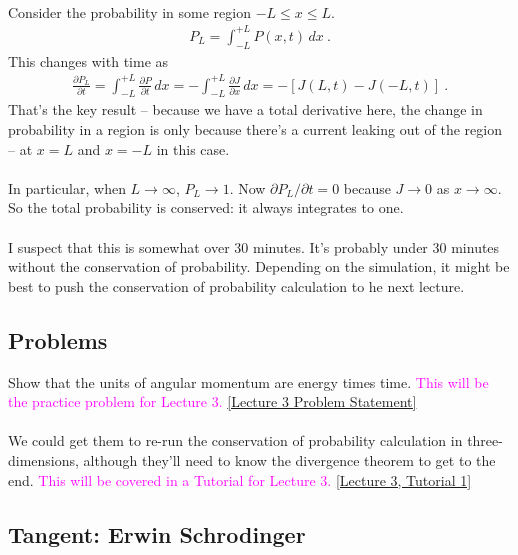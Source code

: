 \documentclass[12pt]{article}
\def\be{\begin{eqnarray}}
\def\ee{\end{eqnarray}}
\newcommand{\nn}{\nonumber}
\newcommand\para{\paragraph{}}
\newcommand{\ppp}[2]{\frac{\partial {#1}}{\partial {#2}}}
\newcommand{\ra}{\rightarrow}
\newcommand{\alyssa}{\textcolor{magenta}}
\begin{document}
\para
{\color{olive} Consider the probability in some region $-L \leq x\leq L$. 
%
\be P_L = \int_{-L}^{+L} P(x,t) \,dx\ .\nn\ee
%
This changes with time as
%
\be \ppp{P_L}{t} = \int_{-L}^{+L} \ppp{P}{t} \,dx = -\int_{-L}^{+L} \ppp{J}{x} \,dx = -\left[J(L,t) - J(-L,t)\right]\ .\nn\ee 
}
That's the key result -- because we have a total derivative here, the change in probability in a region is only because there's a current leaking out of the region -- at $x=L$ and $x=-L$ in this case. 

\para
{\color{olive} In particular, when $L\rightarrow \infty$, $P_L\ra 1$. Now $\partial P_L/\partial t=0$ because $J\ra 0$ as $x\ra \infty$. So the total probability is conserved: it always integrates to one.}

\para
{\color{red} I suspect that this is somewhat over 30 minutes. It's probably under 30 minutes without the conservation of probability. Depending on the simulation, it might be best to push the conservation of probability calculation to he next lecture.}

{\color{blue} 
\subsection{Problems}
Show that the units of angular momentum are energy times time. \alyssa{This will be the practice problem for Lecture 3.} \href{https://drive.google.com/file/d/1Qu2bBqQa2FQBaBoZ9YU335qluru4K50T/view?usp=drive_link}{[Lecture 3 Problem Statement]}

\para
We could get them to re-run the conservation of probability calculation in three-dimensions, although they'll need to know the divergence theorem to get to the end. \alyssa{This will be covered in a Tutorial for Lecture 3.} \href{https://drive.google.com/file/d/12JSixdQ0R_mRoL3O6Sr0HWOza6faMNb5/view?usp=drive_link}{[Lecture 3, Tutorial 1]}
}


\subsection{Tangent: Erwin Schrodinger}
\end{document}
